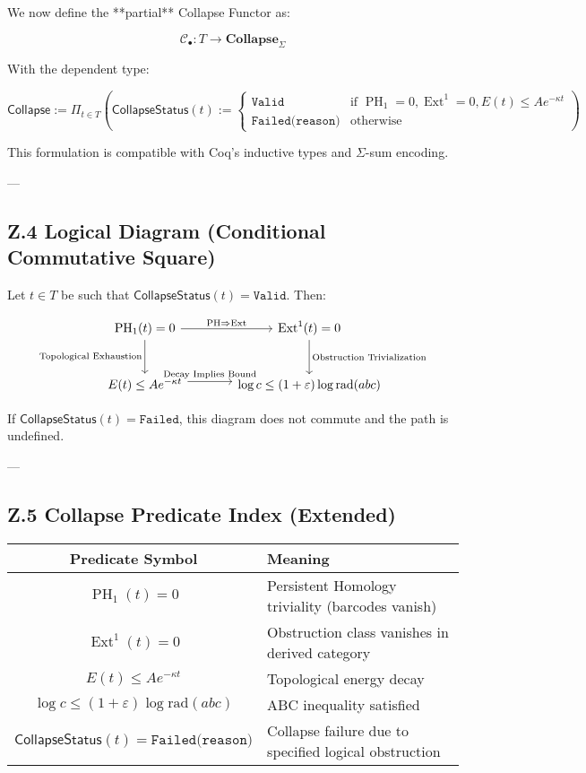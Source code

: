 \documentclass[11pt]{article}
\DeclareMathOperator{\Ext}{Ext}
\DeclareMathOperator{\PH}{PH}
\begin{document}
We now define the **partial** Collapse Functor as:

\[
\mathcal{C}_\bullet : T \longrightarrow \mathbf{Collapse}_{\Sigma}
\]

With the dependent type:

\[
\mathsf{Collapse} := \Pi_{t \in T} \left(
  \mathsf{CollapseStatus}(t) := 
  \begin{cases}
    \texttt{Valid} & \text{if } \PH_1 = 0, \Ext^1 = 0, E(t) \leq Ae^{-\kappa t} \\
    \texttt{Failed(reason)} & \text{otherwise}
  \end{cases}
\right)
\]

This formulation is compatible with Coq's inductive types and \( \Sigma \)-sum encoding.

---

\subsection*{Z.4 Logical Diagram (Conditional Commutative Square)}

Let \( t \in T \) be such that \( \mathsf{CollapseStatus}(t) = \texttt{Valid} \). Then:

\[
\begin{tikzcd}[row sep=large, column sep=large]
\PH_1(t) = 0 \arrow[r, "\text{PH} \Rightarrow \Ext"] \arrow[d, swap, "\text{Topological Exhaustion}"]
& \Ext^1(t) = 0 \arrow[d, "\text{Obstruction Trivialization}"] \\
E(t) \leq Ae^{-\kappa t} \arrow[r, "\text{Decay Implies Bound}", yshift=0.7ex]
& \log c \leq (1+\varepsilon)\log \mathrm{rad}(abc)
\end{tikzcd}
\]

If \( \mathsf{CollapseStatus}(t) = \texttt{Failed} \), this diagram does not commute and the path is undefined.

---

\subsection*{Z.5 Collapse Predicate Index (Extended)}

\begin{center}
\begin{tabular}{|c|p{10cm}|}
\hline
\textbf{Predicate Symbol} & \textbf{Meaning} \\
\hline
\( \PH_1(t) = 0 \) & Persistent Homology triviality (barcodes vanish) \\
\hline
\( \Ext^1(t) = 0 \) & Obstruction class vanishes in derived category \\
\hline
\( E(t) \leq Ae^{-\kappa t} \) & Topological energy decay \\
\hline
\( \log c \leq (1+\varepsilon)\log \mathrm{rad}(abc) \) & ABC inequality satisfied \\
\hline
\( \mathsf{CollapseStatus}(t) = \texttt{Failed(reason)} \) & Collapse failure due to specified logical obstruction \\
\hline
\end{tabular}
\end{center}
\end{document}
